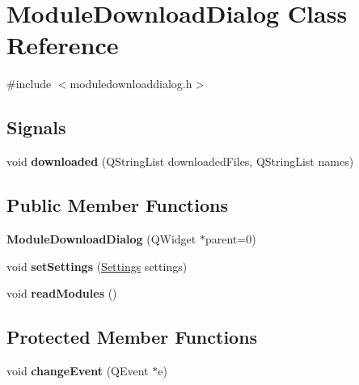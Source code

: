 \hypertarget{classModuleDownloadDialog}{
\section{ModuleDownloadDialog Class Reference}
\label{classModuleDownloadDialog}
}


{\ttfamily \#include $<$moduledownloaddialog.h$>$}

\subsection*{Signals}
\begin{DoxyCompactItemize}
\item 
\hypertarget{classModuleDownloadDialog_a285d9619e209258c79f40dc34b8682d4}{
void {\bfseries downloaded} (QStringList downloadedFiles, QStringList names)}
\label{classModuleDownloadDialog_a285d9619e209258c79f40dc34b8682d4}

\end{DoxyCompactItemize}
\subsection*{Public Member Functions}
\begin{DoxyCompactItemize}
\item 
\hypertarget{classModuleDownloadDialog_a893c5c6dfa7680361af886502a0f80e3}{
{\bfseries ModuleDownloadDialog} (QWidget $\ast$parent=0)}
\label{classModuleDownloadDialog_a893c5c6dfa7680361af886502a0f80e3}

\item 
\hypertarget{classModuleDownloadDialog_a471587fb7073ab5113bfed9f46aca5f7}{
void {\bfseries setSettings} (\hyperlink{classSettings}{Settings} settings)}
\label{classModuleDownloadDialog_a471587fb7073ab5113bfed9f46aca5f7}

\item 
\hypertarget{classModuleDownloadDialog_af63cad20b2af821018617fb49f2c3e77}{
void {\bfseries readModules} ()}
\label{classModuleDownloadDialog_af63cad20b2af821018617fb49f2c3e77}

\end{DoxyCompactItemize}
\subsection*{Protected Member Functions}
\begin{DoxyCompactItemize}
\item 
\hypertarget{classModuleDownloadDialog_a6b1d8ab0687323e33b28ed53a9f1f341}{
void {\bfseries changeEvent} (QEvent $\ast$e)}
\label{classModuleDownloadDialog_a6b1d8ab0687323e33b28ed53a9f1f341}

\end{DoxyCompactItemize}


